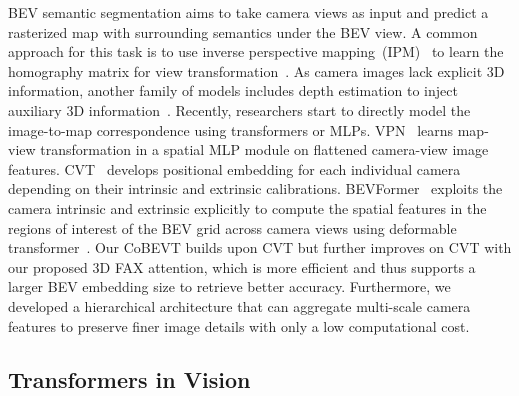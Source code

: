 \documentclass{article}
\begin{document}
BEV semantic segmentation aims to take camera views as input and predict a rasterized map with surrounding semantics under the BEV view.
%
A common approach for this task is to use inverse perspective mapping~(IPM)~\cite{mallot1991inverse} to learn the homography matrix for view transformation~\cite{reiher2020sim2real, bruls2019right,zhu2021monocular}.
%
As camera images lack explicit 3D information, another family of models includes depth estimation to inject auxiliary 3D information~\cite{hu2021fiery,philion2020lift,ng2020bev}.
%
Recently, researchers start to directly model the image-to-map correspondence using transformers or MLPs.
%
VPN~\cite{pan2020cross} learns map-view transformation in a spatial MLP module on flattened camera-view image features.
%
CVT~\cite{zhou2022cross} develops positional embedding for each individual camera depending on their intrinsic and extrinsic calibrations.  
%
BEVFormer~\cite{li2022bevformer} exploits the camera intrinsic and extrinsic explicitly to compute the spatial features in the regions of interest of the BEV grid across camera views using deformable transformer~\cite{zhu2020deformable}.
%
Our CoBEVT builds upon CVT but further improves on CVT with our proposed 3D FAX attention, which is more efficient and thus supports a larger BEV embedding size to retrieve better accuracy. Furthermore, we developed a hierarchical architecture that can aggregate multi-scale camera features to preserve finer image details with only a low computational cost.

\subsection{Transformers in Vision}
\end{document}
